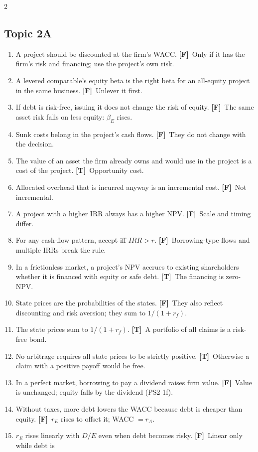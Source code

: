 \documentclass[10pt,a4paper]{article}
\newcommand{\blk}[1]{\subsection*{\color{hd}#1}}
\newcommand{\T}{\textbf{\color{ok}[T]}~}
\newcommand{\F}{\textbf{\color{wr}[F]}~}
\begin{document}
\begin{multicols}{2}
\blk{Topic 2A}
\begin{enumerate}[label=\arabic*.,start=19,leftmargin=1.6em,itemsep=2pt]
  \item A project should be discounted at the firm's WACC. \F Only if it has the firm's risk and
        financing; use the project's own risk.
  \item A levered comparable's equity beta is the right beta for an all-equity project in the same
        business. \F Unlever it first.
  \item If debt is risk-free, issuing it does not change the risk of equity. \F The same asset risk
        falls on less equity: $\beta_E$ rises.
  \item Sunk costs belong in the project's cash flows. \F They do not change with the decision.
  \item The value of an asset the firm already owns and would use in the project is a cost of the
        project. \T Opportunity cost.
  \item Allocated overhead that is incurred anyway is an incremental cost. \F Not incremental.
  \item A project with a higher IRR always has a higher NPV. \F Scale and timing differ.
  \item For any cash-flow pattern, accept iff $IRR>r$. \F Borrowing-type flows and multiple IRRs
        break the rule.
  \item In a frictionless market, a project's NPV accrues to existing shareholders whether it is
        financed with equity or safe debt. \T The financing is zero-NPV.
  \item State prices are the probabilities of the states. \F They also reflect discounting and risk
        aversion; they sum to $1/(1+r_f)$.
  \item The state prices sum to $1/(1+r_f)$. \T A portfolio of all claims is a risk-free bond.
  \item No arbitrage requires all state prices to be strictly positive. \T Otherwise a claim with
        a positive payoff would be free.
  \item In a perfect market, borrowing to pay a dividend raises firm value. \F Value is unchanged;
        equity falls by the dividend (PS2 1f).
  \item Without taxes, more debt lowers the WACC because debt is cheaper than equity. \F $r_E$ rises
        to offset it; WACC $=r_A$.
  \item $r_E$ rises linearly with $D/E$ even when debt becomes risky. \F Linear only while debt is

\end{enumerate}
\end{multicols}
\end{document}
